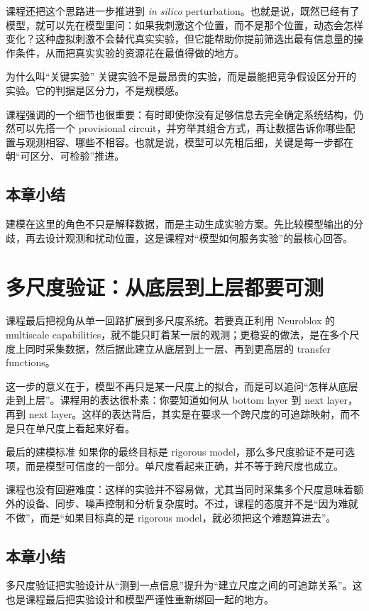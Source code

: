 \documentclass[a4paper]{article}
\begin{document}
课程还把这个思路进一步推进到 \emph{in silico} perturbation。也就是说，既然已经有了模型，就可以先在模型里问：如果我刺激这个位置，而不是那个位置，动态会怎样变化？这种虚拟刺激不会替代真实实验，但它能帮助你提前筛选出最有信息量的操作条件，从而把真实实验的资源花在最值得做的地方。

\begin{knowledgebox}{为什么叫“关键实验”}
关键实验不是最昂贵的实验，而是最能把竞争假设区分开的实验。它的判据是区分力，不是规模感。
\end{knowledgebox}

课程强调的一个细节也很重要：有时即使你没有足够信息去完全确定系统结构，仍然可以先搭一个 provisional circuit，并穷举其组合方式，再让数据告诉你哪些配置与观测相容、哪些不相容。也就是说，模型可以先粗后细，关键是每一步都在朝“可区分、可检验”推进。

\subsection{本章小结}
建模在这里的角色不只是解释数据，而是主动生成实验方案。先比较模型输出的分歧，再去设计观测和扰动位置，这是课程对“模型如何服务实验”的最核心回答。

\section{多尺度验证：从底层到上层都要可测}
课程最后把视角从单一回路扩展到多尺度系统。若要真正利用 Neuroblox 的 multiscale capabilities，就不能只盯着某一层的观测；更稳妥的做法，是在多个尺度上同时采集数据，然后据此建立从底层到上一层、再到更高层的 transfer functions。

这一步的意义在于，模型不再只是某一尺度上的拟合，而是可以追问“怎样从底层走到上层”。课程用的表达很朴素：你要知道如何从 bottom layer 到 next layer，再到 next layer。这样的表达背后，其实是在要求一个跨尺度的可追踪映射，而不是只在单尺度上看起来好看。

\begin{importantbox}{最后的建模标准}
如果你的最终目标是 rigorous model，那么多尺度验证不是可选项，而是模型可信度的一部分。单尺度看起来正确，并不等于跨尺度也成立。
\end{importantbox}

课程也没有回避难度：这样的实验并不容易做，尤其当同时采集多个尺度意味着额外的设备、同步、噪声控制和分析复杂度时。不过，课程的态度并不是“因为难就不做”，而是“如果目标真的是 rigorous model，就必须把这个难题算进去”。

\subsection{本章小结}
多尺度验证把实验设计从“测到一点信息”提升为“建立尺度之间的可追踪关系”。这也是课程最后把实验设计和模型严谨性重新绑回一起的地方。
\end{document}
